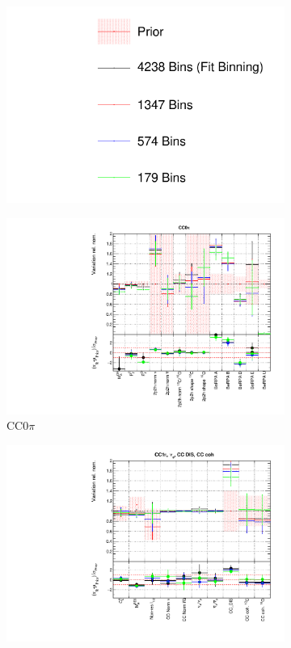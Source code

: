 \begin{figure}
\centering
\begin{subfigure}{0.95\textwidth}
  \centering
  \includegraphics[width=0.25\linewidth]{figs/detcovbin_leg}
\end{subfigure}
\begin{subfigure}{0.49\textwidth}
  \centering
  \includegraphics[width=0.95\linewidth]{figs/detcovbinxsec_1}
  \caption{CC0$\pi$}
\end{subfigure}
\begin{subfigure}{0.49\textwidth}
  \centering
  \includegraphics[width=0.95\linewidth]{figs/detcovbinxsec_2}

\end{subfigure}
\end{figure}
